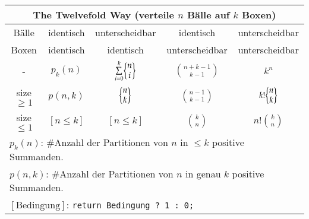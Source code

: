 \begin{tabular}{c|cccc}
	\toprule
	\multicolumn{5}{c}{The Twelvefold Way (verteile $n$ Bälle auf $k$ Boxen)} \\
	\midrule
	Bälle & identisch & unterscheidbar & identisch      & unterscheidbar \\
	Boxen & identisch & identisch      & unterscheidbar & unterscheidbar \\
	\midrule
	- &
	$p_k(n)$ &
	$\sum\limits_{i = 0}^k \biggl\{ \begin{matrix} n \\ i \end{matrix} \biggr\}$ &
	$\binom{n + k - 1}{k - 1}$ &
	$k^n$ \\

	size $\geq 1$ &
	$p(n, k)$ &
	$\biggl\{ \begin{matrix} n \\ k \end{matrix} \biggr\}$ &
	$\binom{n - 1}{k - 1}$ &
	$k! \biggl\{ \begin{matrix} n \\ k \end{matrix} \biggr\}$ \\

	size $\leq 1$ &
	$[n \leq k]$ &
	$[n \leq k]$ &
	$\binom{k}{n}$ &
	$n! \binom{k}{n}$ \\
	\midrule
	\multicolumn{5}{l}{
		$p_k(n)$: \#Anzahl der Partitionen von $n$ in $\leq k$ positive Summanden.
	} \\
	\multicolumn{5}{l}{
		$p(n, k)$: \#Anzahl der Partitionen von $n$ in genau $k$ positive Summanden.
	} \\
	\multicolumn{5}{l}{
		$[\text{Bedingung}]$: \lstinline{return Bedingung ? 1 : 0;}
	} \\
	\bottomrule
\end{tabular}
\vspace{1mm}

